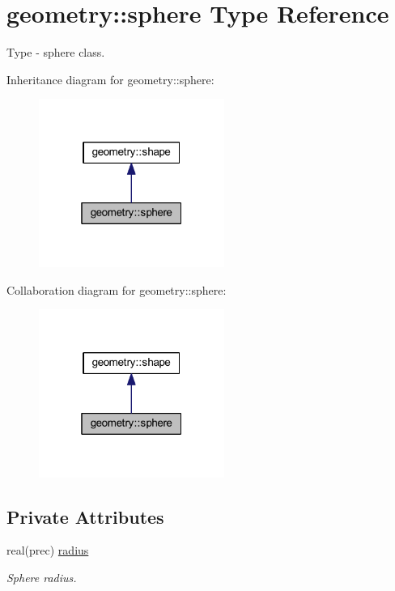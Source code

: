 \hypertarget{structgeometry_1_1sphere}{}\section{geometry\+:\+:sphere Type Reference}
\label{structgeometry_1_1sphere}


Type -\/ sphere class.  




Inheritance diagram for geometry\+:\+:sphere\+:\nopagebreak
\begin{figure}[H]
\begin{center}
\leavevmode
\includegraphics[width=172pt]{structgeometry_1_1sphere__inherit__graph}
\end{center}
\end{figure}


Collaboration diagram for geometry\+:\+:sphere\+:\nopagebreak
\begin{figure}[H]
\begin{center}
\leavevmode
\includegraphics[width=172pt]{structgeometry_1_1sphere__coll__graph}
\end{center}
\end{figure}
\subsection*{Private Attributes}
\begin{DoxyCompactItemize}
\item 
real(prec) \mbox{\hyperlink{structgeometry_1_1sphere_a906fbbdb8c6b56e7d45cea4e96b6e04d}{radius}}
\begin{DoxyCompactList}\small\item\em Sphere radius. \end{DoxyCompactList}\end{DoxyCompactItemize}


